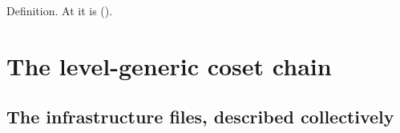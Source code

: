\begin{status}
Definition. At  it is  ().
\end{status}

\section{The level-generic coset chain}\label{l29:sec:chain}

\subsection{The infrastructure files, described collectively}

